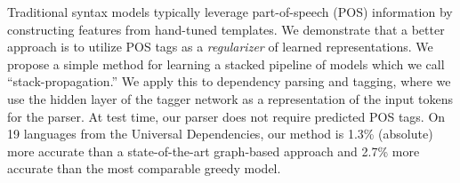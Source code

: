 Traditional syntax models typically leverage part-of-speech (POS) information by constructing features from hand-tuned templates. We demonstrate that a better approach is to utilize POS tags as a {\em regularizer} of learned representations. We propose a simple method for learning a stacked pipeline of models which we call ``stack-propagation.'' We apply this to dependency parsing and tagging, where we use the hidden layer of the tagger network as a representation of the input tokens for the parser. At test time, our parser does not require predicted POS tags. On 19 languages from the Universal Dependencies, our method is 1.3\% (absolute) more accurate than a state-of-the-art graph-based approach and 2.7\% more accurate than the most comparable greedy model.
